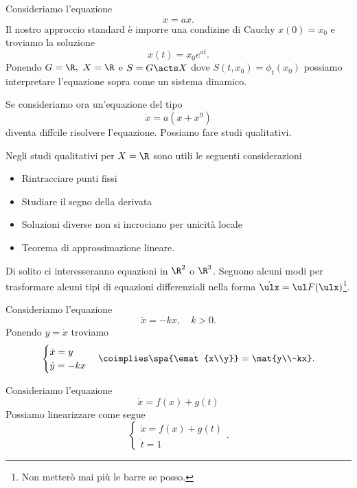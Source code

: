 \begin{example}
Consideriamo l'equazione
\[\dot x=ax.\]
Il nostro approccio standard \`e imporre una condizine di Cauchy $x(0)=x_0$ e troviamo la soluzione
\[x(t)=x_0e^{at}.\]
Ponendo $G=\R,\ X=\R$ e $S=G\acts X$ dove $S(t,x_0)=\phi_t(x_0)$ possiamo interpretare l'equazione sopra come un sistema dinamico.

\noindent
Se consideriamo ora un'equazione del tipo
\[\dot x=a(x+x^9)\]
diventa diffcile risolvere l'equazione. Possiamo fare studi qualitativi.

\noindent Negli studi qualitativi per $X=\R$ sono utili le seguenti considerazioni
\begin{itemize}
\item Rintracciare punti fissi
\item Studiare il segno della derivata
\item Soluzioni diverse non si incrociano per unicit\`a locale
\item Teorema di approssimazione lineare.
\end{itemize}
\end{example}

\noindent Di solito ci interesseranno equazioni in $\R^2$ o $\R^3$. Seguono alcuni modi per trasformare alcuni tipi di equazioni differenziali nella forma $\dot \ulx=\ul F(\ulx)$\footnote{Non metter\`o mai pi\`u le barre se posso.}.
\begin{example}
Consideriamo l'equazione
\[\ddot x=-kx,\quad k>0.\]
Ponendo $y=\dot x$ troviamo
\[\begin{cases}
\dot x=y\\
\dot y=-kx
\end{cases}\coimplies \dot{\spa{\emat{x\\y}}}=\mat{y\\-kx}.\]
\end{example}

\begin{example}
Consideriamo l'equazione
\[\dot x=f(x)+g(t)\]
Possiamo linearizzare come segue
\[\begin{cases}
\dot x=f(x)+g(t)\\
\dot t=1
\end{cases}.\]
\end{example}


